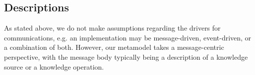 \documentclass[runningheads]{llncs}
\begin{document}



\subsection{Descriptions}
As stated above, we do not make assumptions regarding the drivers for communications, e.g. an implementation may be message-driven, event-driven, or a combination of both. However, our metamodel takes a message-centric perspective, with the message body typically being a description of a knowledge source or a knowledge operation.
\end{document}
